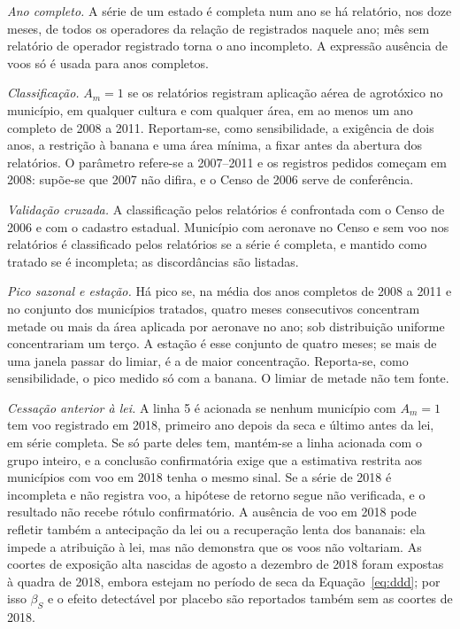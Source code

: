 \begin{apendicesenv}
\begin{alineas}
  \item \emph{Ano completo.} A série de um estado é completa num ano se há
    relatório, nos doze meses, de todos os operadores da relação de
    registrados naquele ano; mês sem relatório de operador registrado torna o
    ano incompleto. A expressão ausência de voos só é usada para anos
    completos.
  \item \emph{Classificação.} $A_m = 1$ se os relatórios registram aplicação
    aérea de agrotóxico no município, em qualquer cultura e com qualquer área,
    em ao menos um ano completo de 2008 a 2011. Reportam-se, como
    sensibilidade, a exigência de dois anos, a restrição à banana e uma área
    mínima, a fixar antes da abertura dos relatórios. O parâmetro refere-se a
    2007--2011 e os registros pedidos começam em 2008: supõe-se que 2007 não
    difira, e o Censo de 2006 serve de conferência.
  \item \emph{Validação cruzada.} A classificação pelos relatórios é
    confrontada com o Censo de 2006 e com o cadastro estadual. Município com
    aeronave no Censo e sem voo nos relatórios é classificado pelos
    relatórios se a série é completa, e mantido como tratado se é incompleta;
    as discordâncias são listadas.
  \item \emph{Pico sazonal e estação.} Há pico se, na média dos anos
    completos de 2008 a 2011 e no conjunto dos municípios tratados, quatro
    meses consecutivos concentram metade ou mais da área aplicada por
    aeronave no ano; sob distribuição uniforme concentrariam um terço. A
    estação é esse conjunto de quatro meses; se mais de uma janela passar do
    limiar, é a de maior concentração. Reporta-se, como sensibilidade, o pico
    medido só com a banana. O limiar de metade não tem fonte.
  \item \emph{Cessação anterior à lei.} A linha 5 é acionada se nenhum
    município com $A_m = 1$ tem voo registrado em 2018, primeiro ano depois
    da seca e último antes da lei, em série completa. Se só parte deles tem,
    mantém-se a linha acionada com o grupo inteiro, e a conclusão
    confirmatória exige que a estimativa restrita aos municípios com voo em
    2018 tenha o mesmo sinal. Se a série de 2018 é incompleta e não registra
    voo, a hipótese de retorno segue não verificada, e o resultado não recebe
    rótulo confirmatório. A ausência de voo em 2018 pode refletir também a
    antecipação da lei ou a recuperação lenta dos bananais: ela impede a
    atribuição à lei, mas não demonstra que os voos não voltariam. As coortes
    de exposição alta nascidas de agosto a dezembro de 2018 foram expostas à
    quadra de 2018, embora estejam no período de seca da
    Equação~\ref{eq:ddd}; por isso $\beta_S$ e o efeito detectável por
    placebo são reportados também sem as coortes de 2018.
\end{alineas}


\end{apendicesenv}
